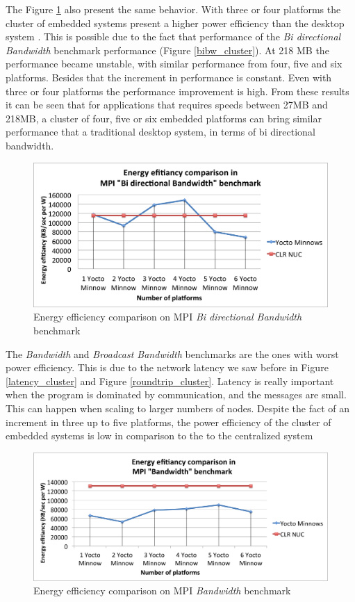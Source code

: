 The Figure \ref{bibw_energy} also present the same behavior. With three or four
platforms the cluster of embedded systems present a higher power efficiency
than the desktop system \cite{NUC}. This is possible due to the fact that
performance of the \textit{Bi directional Bandwidth} benchmark performance
(Figure \ref{bibw_cluster}). At 218 MB the performance became unstable, with
similar performance from four, five and six platforms. Besides that the
increment in performance is constant. Even with three or four platforms the
performance improvement is high. From these results it can be seen that for
applications that requires speeds between 27MB and 218MB, a cluster of four,
five or six embedded platforms can bring similar performance that a traditional
desktop system, in terms of bi directional bandwidth.

\begin{figure}[H]
\centering
\includegraphics[width=1 \textwidth]{images/energy_results/bibw.png}
\caption{Energy efficiency comparison on MPI \textit{Bi directional Bandwidth} benchmark}
\label{bibw_energy}
\end{figure}


The \textit{Bandwidth} and \textit{Broadcast Bandwidth} benchmarks are the ones
with worst power efficiency.  This is due to the network latency we saw before
in Figure \ref{latency_cluster} and Figure \ref{roundtrip_cluster}.  Latency is
really important when the program is dominated by communication, and the
messages are small.  This can happen when scaling to larger numbers of nodes.
Despite the fact of an increment in three up to five platforms, the power
efficiency of the cluster of embedded systems is low in comparison to the
to the centralized system \cite{NUC}

\begin{figure}[H]
\centering
\includegraphics[width=1 \textwidth]{images/energy_results/bandwidth.png}
\caption{Energy efficiency comparison on MPI \textit{Bandwidth} benchmark}
\label{bandwidth_energy}
\end{figure}


